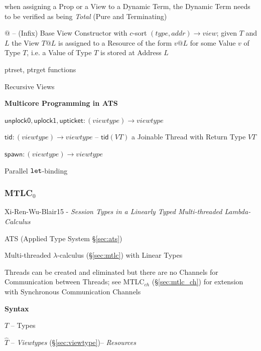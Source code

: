 when assigning a Prop or a View to a Dynamic Term, the Dynamic Term
needs to be verified as being \emph{Total} (Pure and Terminating)

$@$ -- (Infix) Base View Constructor with $c$-sort $(type, addr)
\rightarrow view$; given $T$ and $L$ the View $T@L$ is assigned to a
Resource of the form $v@L$ for some Value $v$ of Type $T$, i.e. a
Value of Type $T$ is stored at Address $L$

ptrset, ptrget functions %

Recursive Views


\textbf{Multicore Programming in ATS}

$\mathsf{unplock0, uplock1, upticket} : (viewtype) \rightarrow
viewtype$

$\mathsf{tid} : (viewtype) \rightarrow viewtype$ -- $\mathsf{tid}(VT)$
a Joinable Thread with Return Type $VT$

$\mathsf{spawn} : (viewtype) \rightarrow viewtype$

Parallel $\mathtt{let}$-binding %



\subsubsection{MTLC$_0$}\label{sec:mtlc_0}

\begingroup

\renewcommand{\Unit}{\mathbf{1}}
\newcommand{\bool}{\mathsf{bool}}
\newcommand{\Bool}{\mathsf{Bool}}
\newcommand{\Choose}{\mathsf{Choose}}
\newcommand{\Nil}{\mathsf{Nil}}
\newcommand{\Send}{\mathsf{Send}}
\newcommand{\Recv}{\mathsf{Recv}}
\newcommand{\Service}{\mathsf{Service}}
\newcommand{\chpos}{\mathbf{chpos}}
\newcommand{\chneg}{\mathbf{chneg}}

Xi-Ren-Wu-Blair15 - \emph{Session Types in a Linearly Typed
  Multi-threaded Lambda-Calculus}

\fist ATS (Applied Type System \S\ref{sec:ats})

Multi-threaded $\lambda$-calculus (\S\ref{sec:mtlc}) with Linear Types

Threads can be created and eliminated but there are no Channels for
Communication between Threads; see MTLC$_{ch}$ (\S\ref{sec:mtlc_ch})
for extension with Synchronous Communication Channels


\textbf{Syntax}


$T$ -- Types

$\hat{T}$ -- \emph{Viewtypes} (\S\ref{sec:viewtype})--
\emph{Resources}

